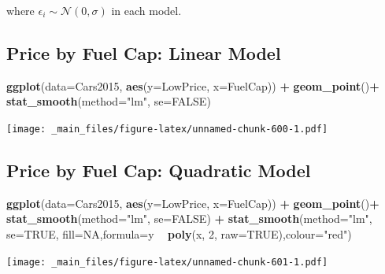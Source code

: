 \documentclass[]{book}
\newenvironment{Shaded}{\begin{snugshade}}{\end{snugshade}}
\newcommand{\KeywordTok}[1]{\textcolor[rgb]{0.13,0.29,0.53}{\textbf{#1}}}
\newcommand{\DataTypeTok}[1]{\textcolor[rgb]{0.13,0.29,0.53}{#1}}
\newcommand{\DecValTok}[1]{\textcolor[rgb]{0.00,0.00,0.81}{#1}}
\newcommand{\StringTok}[1]{\textcolor[rgb]{0.31,0.60,0.02}{#1}}
\newcommand{\OtherTok}[1]{\textcolor[rgb]{0.56,0.35,0.01}{#1}}
\newcommand{\OperatorTok}[1]{\textcolor[rgb]{0.81,0.36,0.00}{\textbf{#1}}}
\newcommand{\NormalTok}[1]{#1}
\begin{document}
where \(\epsilon_i \sim \mathcal{N}(0, \sigma)\) in each model.

\subsection{Price by Fuel Cap: Linear
Model}\label{price-by-fuel-cap-linear-model}

\begin{Shaded}
\begin{Highlighting}[]
\KeywordTok{ggplot}\NormalTok{(}\DataTypeTok{data=}\NormalTok{Cars2015, }\KeywordTok{aes}\NormalTok{(}\DataTypeTok{y=}\NormalTok{LowPrice, }\DataTypeTok{x=}\NormalTok{FuelCap)) }\OperatorTok{+}\StringTok{ }\KeywordTok{geom_point}\NormalTok{()}\OperatorTok{+}\StringTok{ }\KeywordTok{stat_smooth}\NormalTok{(}\DataTypeTok{method=}\StringTok{"lm"}\NormalTok{, }\DataTypeTok{se=}\OtherTok{FALSE}\NormalTok{)}
\end{Highlighting}
\end{Shaded}

\texttt{[image: \_main\_files/figure-latex/unnamed-chunk-600-1.pdf]}

\subsection{Price by Fuel Cap: Quadratic
Model}\label{price-by-fuel-cap-quadratic-model}

\begin{Shaded}
\begin{Highlighting}[]
\KeywordTok{ggplot}\NormalTok{(}\DataTypeTok{data=}\NormalTok{Cars2015, }\KeywordTok{aes}\NormalTok{(}\DataTypeTok{y=}\NormalTok{LowPrice, }\DataTypeTok{x=}\NormalTok{FuelCap)) }\OperatorTok{+}\StringTok{ }\KeywordTok{geom_point}\NormalTok{()}\OperatorTok{+}\StringTok{ }\KeywordTok{stat_smooth}\NormalTok{(}\DataTypeTok{method=}\StringTok{"lm"}\NormalTok{, }\DataTypeTok{se=}\OtherTok{FALSE}\NormalTok{) }\OperatorTok{+}
\StringTok{ }\KeywordTok{stat_smooth}\NormalTok{(}\DataTypeTok{method=}\StringTok{"lm"}\NormalTok{, }\DataTypeTok{se=}\OtherTok{TRUE}\NormalTok{, }\DataTypeTok{fill=}\OtherTok{NA}\NormalTok{,}\DataTypeTok{formula=}\NormalTok{y }\OperatorTok{~}\StringTok{ }\KeywordTok{poly}\NormalTok{(x, }\DecValTok{2}\NormalTok{, }\DataTypeTok{raw=}\OtherTok{TRUE}\NormalTok{),}\DataTypeTok{colour=}\StringTok{"red"}\NormalTok{) }
\end{Highlighting}
\end{Shaded}

\texttt{[image: \_main\_files/figure-latex/unnamed-chunk-601-1.pdf]}
\end{document}
